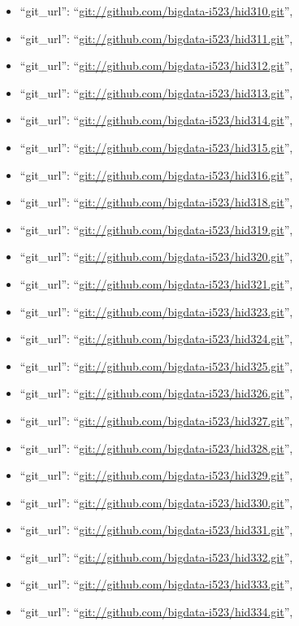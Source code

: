 \begin{itemize}
\item
  ``git\_url'': ``\url{git://github.com/bigdata-i523/hid310.git}'',
\item
  ``git\_url'': ``\url{git://github.com/bigdata-i523/hid311.git}'',
\item
  ``git\_url'': ``\url{git://github.com/bigdata-i523/hid312.git}'',
\item
  ``git\_url'': ``\url{git://github.com/bigdata-i523/hid313.git}'',
\item
  ``git\_url'': ``\url{git://github.com/bigdata-i523/hid314.git}'',
\item
  ``git\_url'': ``\url{git://github.com/bigdata-i523/hid315.git}'',
\item
  ``git\_url'': ``\url{git://github.com/bigdata-i523/hid316.git}'',
\item
  ``git\_url'': ``\url{git://github.com/bigdata-i523/hid318.git}'',
\item
  ``git\_url'': ``\url{git://github.com/bigdata-i523/hid319.git}'',
\item
  ``git\_url'': ``\url{git://github.com/bigdata-i523/hid320.git}'',
\item
  ``git\_url'': ``\url{git://github.com/bigdata-i523/hid321.git}'',
\item
  ``git\_url'': ``\url{git://github.com/bigdata-i523/hid323.git}'',
\item
  ``git\_url'': ``\url{git://github.com/bigdata-i523/hid324.git}'',
\item
  ``git\_url'': ``\url{git://github.com/bigdata-i523/hid325.git}'',
\item
  ``git\_url'': ``\url{git://github.com/bigdata-i523/hid326.git}'',
\item
  ``git\_url'': ``\url{git://github.com/bigdata-i523/hid327.git}'',
\item
  ``git\_url'': ``\url{git://github.com/bigdata-i523/hid328.git}'',
\item
  ``git\_url'': ``\url{git://github.com/bigdata-i523/hid329.git}'',
\item
  ``git\_url'': ``\url{git://github.com/bigdata-i523/hid330.git}'',
\item
  ``git\_url'': ``\url{git://github.com/bigdata-i523/hid331.git}'',
\item
  ``git\_url'': ``\url{git://github.com/bigdata-i523/hid332.git}'',
\item
  ``git\_url'': ``\url{git://github.com/bigdata-i523/hid333.git}'',
\item
  ``git\_url'': ``\url{git://github.com/bigdata-i523/hid334.git}'',

\end{itemize}

